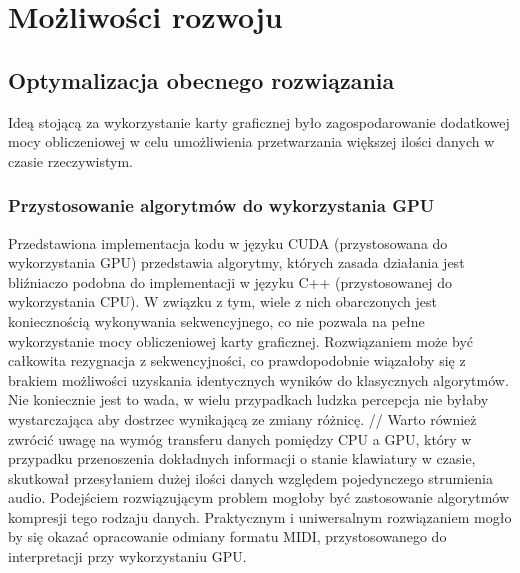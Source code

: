 \chapter{Możliwości rozwoju}

\section{Optymalizacja obecnego rozwiązania}
Ideą stojącą za wykorzystanie karty graficznej było zagospodarowanie dodatkowej mocy obliczeniowej w celu umożliwienia przetwarzania większej ilości danych w czasie rzeczywistym.

\subsection{Przystosowanie algorytmów do wykorzystania GPU}
Przedstawiona implementacja kodu w języku CUDA (przystosowana do wykorzystania GPU) przedstawia algorytmy, których zasada działania jest bliźniaczo podobna do implementacji w języku C++ (przystosowanej do wykorzystania CPU). W związku z tym, wiele z nich obarczonych jest koniecznością wykonywania sekwencyjnego, co nie pozwala na pełne wykorzystanie mocy obliczeniowej karty graficznej. Rozwiązaniem może być całkowita rezygnacja z sekwencyjności, co prawdopodobnie wiązałoby się z brakiem możliwości uzyskania identycznych wyników do klasycznych algorytmów. Nie koniecznie jest to wada, w wielu przypadkach ludzka percepcja nie byłaby wystarczająca aby dostrzec wynikającą ze zmiany różnicę. 
//
Warto również zwrócić uwagę na wymóg transferu danych pomiędzy CPU a GPU, który w przypadku przenoszenia dokładnych informacji o stanie klawiatury w czasie, skutkował przesyłaniem dużej ilości danych względem pojedynczego strumienia audio. Podejściem rozwiązującym problem mogłoby być zastosowanie algorytmów kompresji tego rodzaju danych. Praktycznym i uniwersalnym rozwiązaniem mogło by się okazać opracowanie odmiany formatu MIDI, przystosowanego do interpretacji przy wykorzystaniu GPU.

